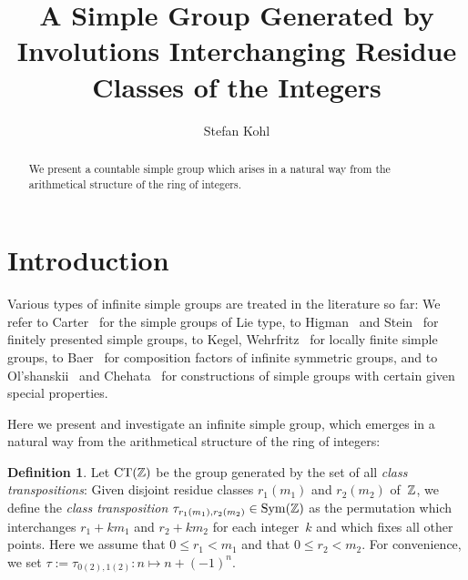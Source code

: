 \documentclass{amsart}
\theoremstyle{definition} \newtheorem{CTZDefinition}{Definition}[section]
\theoremstyle{plain}      \newtheorem{CTZPropertiesTheorem}[CTZDefinition]{Theorem}
\theoremstyle{plain}      \newtheorem{CTZSubgroupsTheorem}[CTZDefinition]{Theorem}
\theoremstyle{definition} \newtheorem{RcwaMappingDefinition}{Definition}[section]
\theoremstyle{definition} \newtheorem{RCWADefinition}[RcwaMappingDefinition]{Definition}
\theoremstyle{plain}      \newtheorem{CTZNotFinitelyGeneratedTheorem}
\theoremstyle{definition} \newtheorem{CTZSmEmbeddingDefinition}[RcwaMappingDefinition]{Definition}
\theoremstyle{plain}      \newtheorem{CTZHighlyTransitiveTheorem}[RcwaMappingDefinition]{Theorem}
\theoremstyle{plain}      \newtheorem{CTZTorsionElementsDivisibleTheorem}
\theoremstyle{plain}      \newtheorem{CTLemma}{Lemma}[section]
\theoremstyle{plain}      \newtheorem{IntegralCommutatorLemma}[CTLemma]{Lemma}
\theoremstyle{plain}      \newtheorem{NormalSubgroupContainsIntegralElementLemma}[CTLemma]{Lemma}
\theoremstyle{plain}      \newtheorem{CTZSimpleTheorem}[CTLemma]{Theorem}
\theoremstyle{remark}     \newtheorem{CTZSimpleRemark}[CTLemma]{Remark}
\theoremstyle{definition} \newtheorem{CTPZDefinition}[CTLemma]{Definition}
\theoremstyle{plain}      \newtheorem{CTPZSimpleCorollary}[CTLemma]{Corollary}
\theoremstyle{plain}      \newtheorem{CTPZSimpleProblem}[CTLemma]{Problem}
\theoremstyle{plain}      \newtheorem{FnPSL2ZEmbeddingTheorem}{Theorem}[section]
\theoremstyle{plain}      \newtheorem{FreeProductEmbeddingTheorem}[FnPSL2ZEmbeddingTheorem]{Theorem}
\theoremstyle{definition} \newtheorem{RestrictionMonomorphismDefinition}
\theoremstyle{plain}      \newtheorem{DirectAndWreathProductsEmbeddingTheorem}
\theoremstyle{plain}      \newtheorem{DirectAndWreathProductsEmbeddingCorollary}
\theoremstyle{definition} \newtheorem{CTintZDefinition}[FnPSL2ZEmbeddingTheorem]{Definition}
\theoremstyle{plain}      \newtheorem{CTintZSimpleTheorem}[FnPSL2ZEmbeddingTheorem]{Theorem}
\theoremstyle{definition} \newtheorem{KernelDefinition}{Definition}[section]
\theoremstyle{definition} \newtheorem{TameWildDefinition}[KernelDefinition]{Definition}
\theoremstyle{definition} \newtheorem{SimpleSupergroupsDefinition}[KernelDefinition]{Definition}
\theoremstyle{definition} \newtheorem{CSCRDefinition}[KernelDefinition]{Definition}
\theoremstyle{plain}      \newtheorem{SimpleSupergroupsGeneratorsTheorem}[KernelDefinition]{Theorem}
\theoremstyle{plain}      \newtheorem{SimpleSupergroupsTheorem}[KernelDefinition]{Theorem}
\theoremstyle{plain}      \newtheorem{SimpleSupergroupsTransitivityTheorem}
\theoremstyle{plain}      \newtheorem{TameGenerationConjecture}[KernelDefinition]{Conjecture}
\theoremstyle{remark}     \newtheorem{TameGenerationRemark}[KernelDefinition]{Remark}
\begin{document}
\title[A Simple Group Generated by Involutions Interchanging Residue Classes]
{A Simple Group Generated by Involutions Interchanging Residue Classes of the Integers}

\author{Stefan Kohl}

\address{Institut f\"ur Geometrie und Topologie \\
         Pfaffenwaldring 57 \\
         Universit\"at Stuttgart  Stuttgart \\
         Germany}



\date{}

\begin{abstract}
  We present a countable simple group which arises in a natural way from the arithmetical
  structure of the ring of integers.
\end{abstract}

\maketitle

\section{Introduction} \label{Introduction}

Various types of infinite simple groups are treated in the literature so far:
We refer to Carter~\cite{Carter72} for the simple groups of Lie type, to Higman~\cite{Higman74}
and Stein~\cite{Stein92} for finitely presented simple groups, to Kegel,
Wehrfritz~\cite{KegelWehrfritz73} for locally finite simple groups, to Baer~\cite{Baer34} for
composition factors of infinite symmetric groups, and to Ol'shanskii~\cite{Olshanskii79} and
Chehata~\cite{Chehata52} for constructions of simple groups with certain given special properties.

Here we present and investigate an infinite simple group, which emerges in a natural way from
the arithmetical structure of the ring of integers:

\begin{CTZDefinition} \label{CTZDefinition}
  Let \(\CT{\ZZ}\) be the group generated by the set of all \emph{class transpositions}:
  Given disjoint residue classes \(r_1(m_1)\) and \(r_2(m_2)\) of~\(\mathbb{Z}\), we define the
  \emph{class transposition} \(\tau_{r_1(m_1),r_2(m_2)} \in \SYM{\ZZ}\) as the permutation which
  interchanges \(r_1 + km_1\) and \(r_2 + km_2\) for each integer~\(k\) and which fixes all other
  points. Here we assume that \(0 \leq r_1 < m_1\) and that \(0 \leq r_2 < m_2\).
  For convenience, we set \(\tau := \tau_{0(2),1(2)}: n \mapsto n + (-1)^n\).
\end{CTZDefinition}
\end{document}
